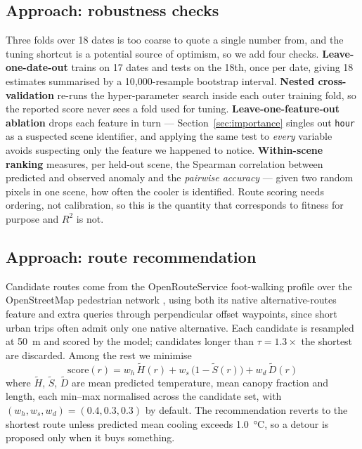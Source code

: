 \documentclass[10pt]{article}   %
\begin{document}
\subsection{Approach: robustness checks}
\label{sec:robustness}
Three folds over 18 dates is too coarse to quote a single number from, and the tuning
shortcut is a potential source of optimism, so we add four checks.
\textbf{Leave-one-date-out} trains on 17 dates and tests on the 18th, once per date, giving
18 estimates summarised by a 10{,}000-resample bootstrap interval. \textbf{Nested
cross-validation} re-runs the hyper-parameter search inside each outer training fold, so the
reported score never sees a fold used for tuning. \textbf{Leave-one-feature-out ablation}
drops each feature in turn --- Section~\ref{sec:importance} singles out \texttt{hour} as a
suspected scene identifier, and applying the same test to \emph{every} variable avoids
suspecting only the feature we happened to notice. \textbf{Within-scene ranking} measures,
per held-out scene, the Spearman correlation between predicted and observed anomaly and the
\emph{pairwise accuracy} --- given two random pixels in one scene, how often the cooler is
identified. Route scoring needs ordering, not calibration, so this is the quantity that
corresponds to fitness for purpose and $R^2$ is not.

\subsection{Approach: route recommendation}
\label{sec:routing-approach}
Candidate routes come from the OpenRouteService \citep{ors2026} foot-walking profile over
the OpenStreetMap pedestrian network \citep{osm}, using both its native alternative-routes
feature and extra queries through perpendicular offset waypoints, since short urban trips
often admit only one native alternative. Each candidate is resampled at \SI{50}{\metre} and
scored by the model; candidates longer than $\tau = 1.3\times$ the shortest are discarded.
Among the rest we minimise
\begin{equation}
  \text{score}(r) = w_h \, \tilde{H}(r) + w_s \, \bigl(1 - \tilde{S}(r)\bigr) + w_d \, \tilde{D}(r)
\end{equation}
where $\tilde{H}$, $\tilde{S}$, $\tilde{D}$ are mean predicted temperature, mean canopy
fraction and length, each min--max normalised across the candidate set, with
$(w_h, w_s, w_d) = (0.4, 0.3, 0.3)$ by default. The recommendation reverts to the shortest
route unless predicted mean cooling exceeds \SI{1.0}{\celsius}, so a detour is proposed only
when it buys something.
\end{document}
